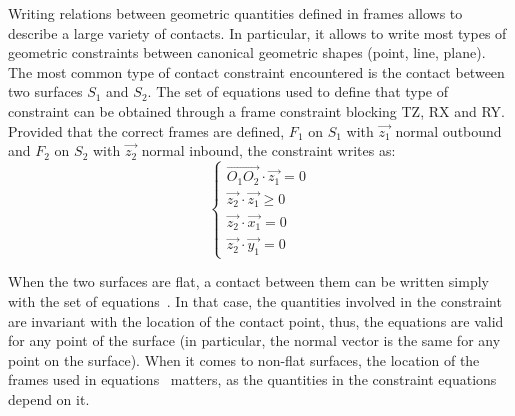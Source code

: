 Writing relations between geometric quantities defined in frames allows to describe a large variety of contacts.
In particular, it allows to write most types of geometric constraints between canonical geometric shapes (point, line, plane).
The most common type of contact constraint encountered is the contact between two surfaces $S_1$ and $S_2$.
The set of equations used to define that type of constraint can be obtained through a frame constraint blocking TZ, RX and RY.
Provided that the correct frames are defined, $F_1$ on $S_1$ with $\vec{z_1}$ normal outbound and $F_2$ on $S_2$ with $\vec{z_2}$ normal inbound, the constraint writes as:
\begin{equation}
  \left\{
  \begin{array}{ll}
    \overrightarrow{O_1O_2}\cdot\vec{z_1} = 0\\
    \vec{z_2}\cdot\vec{z_1} \geq 0 \\
    \vec{z_2}\cdot\vec{x_1} = 0 \\
    \vec{z_2}\cdot\vec{y_1} = 0
  \end{array}
  \right.
\label{eq:planar_contact}
\end{equation}

When the two surfaces are flat, a contact between them can be written simply with the set of equations~.
In that case, the quantities involved in the constraint are invariant with the location of the contact point, thus, the equations are valid for any point of the surface (in particular, the normal vector is the same for any point on the surface).
When it comes to non-flat surfaces, the location of the frames used in equations~ matters, as the quantities in the constraint equations depend on it.


